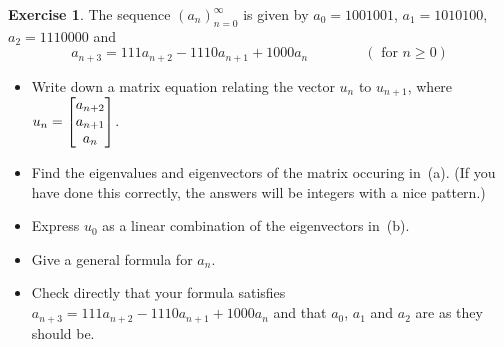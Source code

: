 \documentclass[a4paper]{amsart}
\theoremstyle{definition}
\newtheorem{exercise}{Exercise}
\begin{document}
\begin{exercise}\label{ex-diffeq-ii}
 The sequence $(a_n)_{n=0}^\infty$ is given by 
 $a_0=1001001$, $a_1=1010100$, $a_2=1110000$ and 
 \[ a_{n+3} = 111 a_{n+2} - 1110 a_{n+1} + 1000 a_n
   \hspace{4em} (\text{ for } n \geq 0)
 \] 
 \begin{itemize}
  \item[(a)] Write down a matrix equation relating the vector $u_n$ to
   $u_{n+1}$, where $u_n=\left[\begin{matrix} a_{n+2}\\ a_{n+1}\\ a_n\end{matrix}\right]$.
  \item[(b)] Find the eigenvalues and eigenvectors of the matrix
   occuring in~(a).  (If you have done this correctly, the answers
   will be integers with a nice pattern.)
  \item[(c)] Express $u_0$ as a linear combination of the eigenvectors
   in~(b).
  \item[(d)] Give a general formula for $a_n$.
  \item[(e)] Check directly that your formula satisfies
   $a_{n+3}=111a_{n+2}-1110 a_{n+1}+1000a_n$ and that $a_0$, $a_1$ and
   $a_2$ are as they should be.
 \end{itemize}
\end{exercise}
\end{document}
